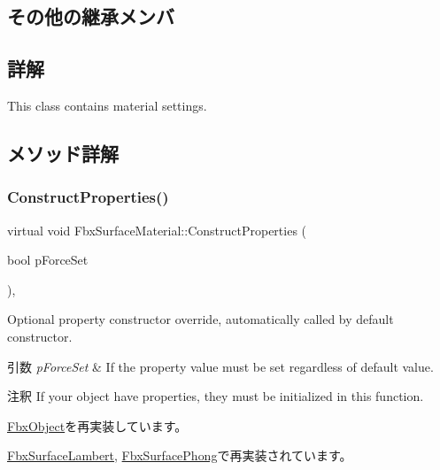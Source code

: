 \subsection*{その他の継承メンバ}


\subsection{詳解}
This class contains material settings. 

\subsection{メソッド詳解}
\mbox{\label{class_fbx_surface_material_aafc5d21293bea6b63a6ea96fa9fe0bb2}} 
\subsubsection{\texorpdfstring{Construct\+Properties()}{ConstructProperties()}}
{\footnotesize\ttfamily virtual void Fbx\+Surface\+Material\+::\+Construct\+Properties (\begin{DoxyParamCaption}\item[{bool}]{p\+Force\+Set }\end{DoxyParamCaption})\hspace{0.3cm}{\ttfamily [protected]}, {\ttfamily [virtual]}}

Optional property constructor override, automatically called by default constructor. 
\begin{DoxyParams}{引数}
{\em p\+Force\+Set} & If the property value must be set regardless of default value. \\
\hline
\end{DoxyParams}
\begin{DoxyRemark}{注釈}
If your object have properties, they must be initialized in this function. 
\end{DoxyRemark}


\hyperlink{class_fbx_object_ad44f814323dc1b5e78bff1bfc608b4bb}{Fbx\+Object}を再実装しています。



\hyperlink{class_fbx_surface_lambert_a6693e1c08050978c78eece2aa48688e9}{Fbx\+Surface\+Lambert}, \hyperlink{class_fbx_surface_phong_aa4262a042d35769e8ff745d408315bf9}{Fbx\+Surface\+Phong}で再実装されています。

